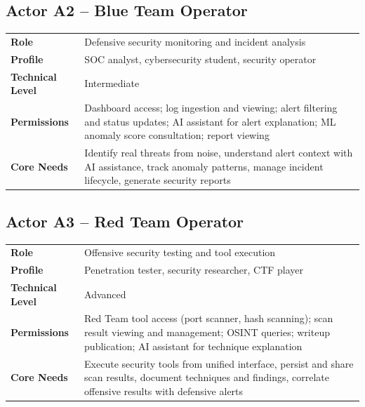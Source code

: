 \documentclass[12pt,a4paper]{report}
\begin{document}
	\subsection{Actor A2 -- Blue Team Operator}
	\begin{infobox}[title=Blue Team Operator]
		\begin{tabular}{L{3.8cm} L{8.8cm}}
			\textbf{Role} & Defensive security monitoring and incident analysis \\
			\textbf{Profile} & SOC analyst, cybersecurity student, security operator \\
			\textbf{Technical Level} & Intermediate \\
			\textbf{Permissions} & Dashboard access; log ingestion and viewing; alert filtering and status updates; AI assistant for alert explanation; ML anomaly score consultation; report viewing \\
			\textbf{Core Needs} & Identify real threats from noise, understand alert context with AI assistance, track anomaly patterns, manage incident lifecycle, generate security reports \\
		\end{tabular}
	\end{infobox}
	
	\subsection{Actor A3 -- Red Team Operator}
	\begin{infobox}[title=Red Team Operator]
		\begin{tabular}{L{3.8cm} L{8.8cm}}
			\textbf{Role} & Offensive security testing and tool execution \\
			\textbf{Profile} & Penetration tester, security researcher, CTF player \\
			\textbf{Technical Level} & Advanced \\
			\textbf{Permissions} & Red Team tool access (port scanner, hash scanning); scan result viewing and management; OSINT queries; writeup publication; AI assistant for technique explanation \\
			\textbf{Core Needs} & Execute security tools from unified interface, persist and share scan results, document techniques and findings, correlate offensive results with defensive alerts \\
		\end{tabular}
	\end{infobox}
	
\end{document}
